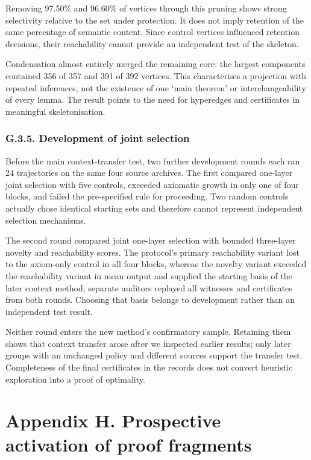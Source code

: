 \documentclass[pdflatex,sn-basic,Numbered]{sn-jnl}
\begin{document}
\endgroup

Removing 97.50\% and 96.60\% of vertices through this pruning shows strong selectivity relative to the set under protection. It does not imply retention of the same percentage of semantic content. Since control vertices influenced retention decisions, their reachability cannot provide an independent test of the skeleton.

Condensation almost entirely merged the remaining core: the largest components contained 356 of 357 and 391 of 392 vertices. This characterises a projection with repeated inferences, not the existence of one `main theorem' or interchangeability of every lemma. The result points to the need for hyperedges and certificates in meaningful skeletonisation.

\subsubsection*{G.3.5. Development of joint selection}\label{g.3.5.-development-of-joint-selection}

Before the main context-transfer test, two further development rounds each ran 24 trajectories on the same four source archives. The first compared one-layer joint selection with five controls, exceeded axiomatic growth in only one of four blocks, and failed the pre-specified rule for proceeding. Two random controls actually chose identical starting sets and therefore cannot represent independent selection mechanisms.

The second round compared joint one-layer selection with bounded three-layer novelty and reachability scores. The protocol's primary reachability variant lost to the axiom-only control in all four blocks, whereas the novelty variant exceeded the reachability variant in mean output and supplied the starting basis of the later context method; separate auditors replayed all witnesses and certificates from both rounds. Choosing that basis belongs to development rather than an independent test result.

Neither round enters the new method's confirmatory sample. Retaining them shows that context transfer arose after we inspected earlier results; only later groups with an unchanged policy and different sources support the transfer test. Completeness of the final certificates in the records does not convert heuristic exploration into a proof of optimality.

\section*{Appendix H. Prospective activation of proof fragments}\label{appendix-h.-prospective-activation-of-proof-fragments}
\end{document}
